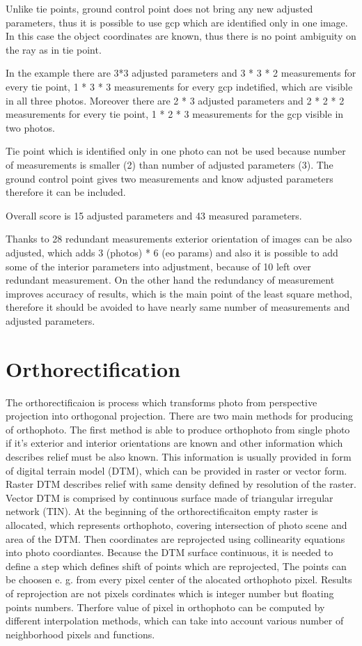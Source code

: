 \documentclass[a4paper,12pt]{report}
\begin{document}
Unlike tie points, ground control point does not bring any new adjusted parameters, thus
it is possible to use gcp which are identified only in one image. In this case the object coordinates 
are known, thus there is no point ambiguity on the ray as in tie point. 

In the example there are 3*3 adjusted parameters and 3 * 3 * 2 measurements for every tie point,  
1 * 3 * 3 measurements for every gcp indetified, which are visible in all three photos. 
Moreover there are 2 * 3 adjusted parameters and 2 * 2 * 2 measurements for every tie point,  
1 * 2 * 3 measurements for the gcp visible in two photos.

Tie point which is identified only in one photo can not be used because number of measurements is smaller (2) than number of adjusted parameters (3).
The ground control point gives two measurements and know adjusted parameters therefore it can be included.

Overall score is 15 adjusted parameters and 43 measured parameters.

Thanks to 28 redundant measurements exterior orientation of images can be also adjusted, which adds 3 (photos) * 6 (eo params)
and also it is possible to add some of the interior parameters into adjustment, because of 10 left over redundant measurement.  
On the other hand the redundancy of measurement improves accuracy of results, which is the main point of the least square method,
therefore it should be avoided to have nearly same number of measurements and adjusted parameters.

\section{Orthorectification}

The orthorectificaion is process which transforms photo from perspective projection into orthogonal projection. 
\label{sec:single_ortho}
There are two main methods for producing of orthophoto. The first method is able to produce orthophoto 
from single photo if it's exterior and interior orientations are known and other information which describes
relief must be also known. This information is usually provided in form of digital terrain model (DTM), which 
can be provided in raster or vector form. Raster DTM describes relief with same density defined by resolution of the raster.
Vector DTM is comprised by continuous surface made of triangular irregular network (TIN). 
At the beginning of the orthorectificaiton empty raster is allocated, which represents orthophoto, 
covering intersection of photo scene and area of the DTM. Then coordinates are reprojected using collinearity
equations into photo coordiantes. Because the DTM surface continuous, it is needed to define 
a step which defines shift of points which are reprojected, The points can be choosen e. g. from every pixel center
of the alocated orthophoto pixel. Results of reprojection are not pixels cordinates which is integer number but 
floating points numbers. Therfore value of pixel in orthophoto can be computed by different interpolation methods,
which can take into account various number of neighborhood pixels and functions.
\end{document}
